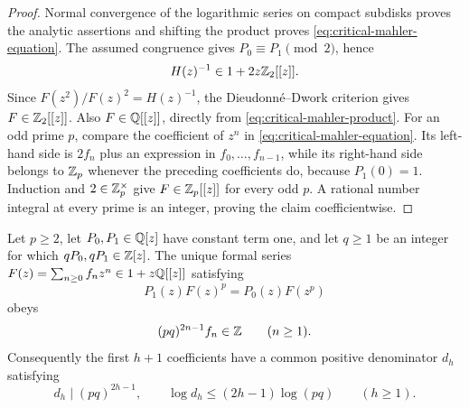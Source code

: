 \begin{proof}
Normal convergence of the logarithmic series on compact subdisks proves the
analytic assertions and shifting the product proves
\eqref{eq:critical-mahler-equation}.  The assumed congruence gives
\(P_0\equiv P_1\pmod2\), hence
\[
 H(z)^{-1}\in1+2z\mathbb{Z}_2[[z]].
\]
Since
\(F(z^2)/F(z)^2=H(z)^{-1}\), the Dieudonn\'e--Dwork criterion
\cite[Theorem~1.1]{PomeratStraub2024RootsPowerSeries} gives
\(F\in\mathbb{Z}_2[[z]]\).  Also \(F\in\mathbb{Q}[[z]]\), directly from
\eqref{eq:critical-mahler-product}.  For an odd prime \(p\), compare the
coefficient of \(z^n\) in \eqref{eq:critical-mahler-equation}.  Its left-hand
side is \(2f_n\) plus an expression in \(f_0,\ldots,f_{n-1}\), while its
right-hand side belongs to \(\mathbb{Z}_p\) whenever the preceding coefficients do,
because \(P_1(0)=1\).  Induction and \(2\in\mathbb{Z}_p^\times\) give
\(F\in\mathbb{Z}_p[[z]]\) for every odd \(p\).  A rational number integral at every
prime is an integer, proving the claim coefficientwise.
\end{proof}

\begin{lemma}
\label{lem:rational-critical-mahler-denominators}
Let \(p\ge2\), let \(P_0,P_1\in\mathbb{Q}[z]\) have constant term one, and let
\(q\ge1\) be an integer for which \(qP_0,qP_1\in\mathbb{Z}[z]\).  The unique formal
series \(F(z)=\sum_{n\ge0}f_nz^n\in1+z\mathbb{Q}[[z]]\) satisfying
\begin{equation}\label{eq:rational-critical-mahler-equation}
 P_1(z)F(z)^p=P_0(z)F(z^p)
\end{equation}
obeys
\begin{equation}\label{eq:rational-critical-mahler-denominator-bound}
 (pq)^{2n-1}f_n\in\mathbb{Z}\qquad(n\ge1).
\end{equation}
Consequently the first \(h+1\) coefficients have a common positive
denominator \(d_h\) satisfying
\begin{equation}\label{eq:rational-critical-mahler-common-denominator}
 d_h\mid(pq)^{2h-1},
 \qquad \log d_h\le(2h-1)\log(pq)\qquad(h\ge1).
\end{equation}
\end{lemma}

